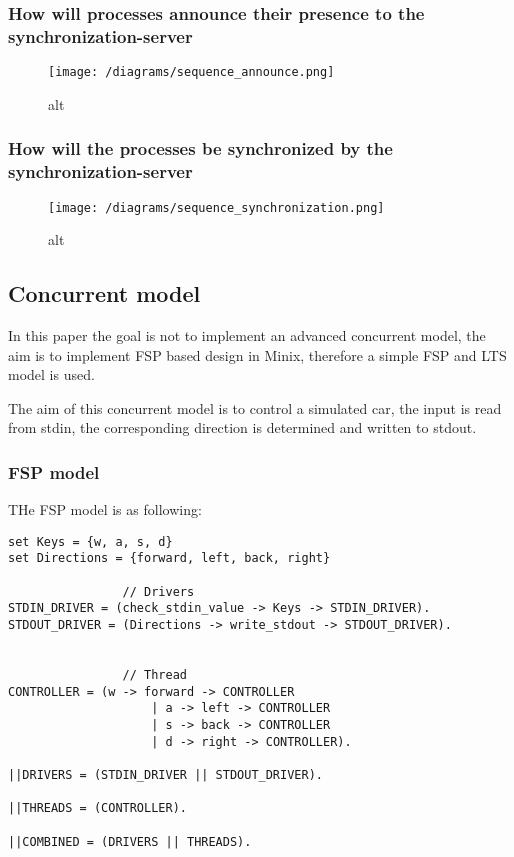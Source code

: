 \hypertarget{how-will-processes-announce-their-presence-to-the-synchronization-server}{%
\subsubsection{How will processes announce their presence to the
synchronization-server}\label{how-will-processes-announce-their-presence-to-the-synchronization-server}}

\begin{figure}
\centering
\texttt{[image: /diagrams/sequence\_announce.png]}
\caption{alt}
\end{figure}

\hypertarget{how-will-the-processes-be-synchronized-by-the-synchronization-server}{%
\subsubsection{How will the processes be synchronized by the
synchronization-server}\label{how-will-the-processes-be-synchronized-by-the-synchronization-server}}

\begin{figure}
\centering
\texttt{[image: /diagrams/sequence\_synchronization.png]}
\caption{alt}
\end{figure}

\hypertarget{concurrent-model}{%
\subsection{Concurrent model}\label{concurrent-model}}

In this paper the goal is not to implement an advanced concurrent model,
the aim is to implement FSP based design in Minix, therefore a simple
FSP and LTS model is used.

The aim of this concurrent model is to control a simulated car, the
input is read from stdin, the corresponding direction is determined and
written to stdout.

\hypertarget{fsp-model}{%
\subsubsection{FSP model}\label{fsp-model}}

THe FSP model is as following:

\begin{verbatim}
set Keys = {w, a, s, d}
set Directions = {forward, left, back, right} 

                // Drivers
STDIN_DRIVER = (check_stdin_value -> Keys -> STDIN_DRIVER).
STDOUT_DRIVER = (Directions -> write_stdout -> STDOUT_DRIVER).


                // Thread
CONTROLLER = (w -> forward -> CONTROLLER 
                    | a -> left -> CONTROLLER 
                    | s -> back -> CONTROLLER
                    | d -> right -> CONTROLLER).

||DRIVERS = (STDIN_DRIVER || STDOUT_DRIVER).

||THREADS = (CONTROLLER).

||COMBINED = (DRIVERS || THREADS).
\end{verbatim}

